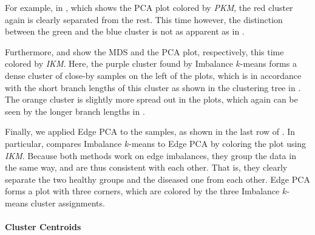 For example, in ,
which shows the PCA plot colored by \emph{PKM}, the red cluster again is clearly separated from the rest.
This time however, the distinction between the green and the blue cluster
is not as apparent as in .

Furthermore,  and  show the MDS and the PCA plot,
respectively, this time colored by \emph{IKM}.
Here, the purple cluster found by Imbalance $k$-means forms a dense cluster of close-by samples on the left of the plots,
which is in accordance with the short branch lengths
of this cluster as shown in the clustering tree in .
The orange cluster is slightly more spread out in the plots,
which again can be seen by the longer branch lengths in .

Finally, we applied Edge PCA to the samples, as shown in the last row of .
In particular,  compares Imbalance $k$-means to Edge PCA
by coloring the plot using \emph{IKM}.
Because both methods work on edge imbalances, they group the data in the same way, and are thus consistent with each other.
That is, they clearly separate the two healthy groups and the diseased one from each other.
Edge PCA forms a plot with three corners, which are colored by the three Imbalance $k$-means cluster assignments.


\paragraph{Cluster Centroids}
\label{ch:Clustering:sec:Results:sub:BVDataset:par:ClusterCentroids}

